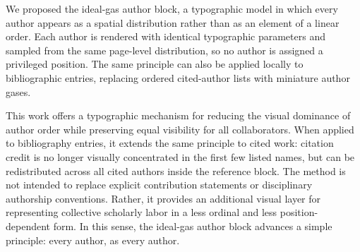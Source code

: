 \documentclass[10pt,letterpaper]{article}
\theoremstyle{definition}
\theoremstyle{remark}
\begin{document}
We proposed the ideal-gas author block, a typographic model in which every author appears as a spatial distribution rather than as an element of a linear order. Each author is rendered with identical typographic parameters and sampled from the same page-level distribution, so no author is assigned a privileged position. The same principle can also be applied locally to bibliographic entries, replacing ordered cited-author lists with miniature author gases.

This work offers a typographic mechanism for reducing the visual dominance of author order while preserving equal visibility for all collaborators. When applied to bibliography entries, it extends the same principle to cited work: citation credit is no longer visually concentrated in the first few listed names, but can be redistributed across all cited authors inside the reference block. The method is not intended to replace explicit contribution statements or disciplinary authorship conventions. Rather, it provides an additional visual layer for representing collective scholarly labor in a less ordinal and less position-dependent form. In this sense, the ideal-gas author block advances a simple principle: every author, as every author.



\newpage



\end{document}
